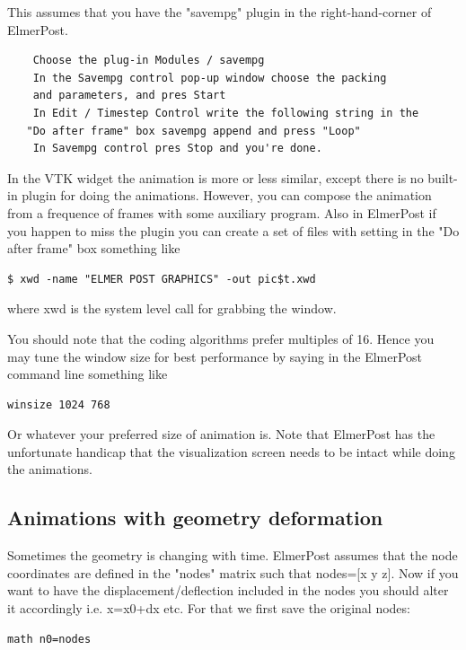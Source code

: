 This assumes that you have the "savempg" plugin in the right-hand-corner of ElmerPost.

\begin{verbatim}
    Choose the plug-in Modules / savempg
    In the Savempg control pop-up window choose the packing
    and parameters, and pres Start
    In Edit / Timestep Control write the following string in the
   "Do after frame" box savempg append and press "Loop"
    In Savempg control pres Stop and you're done. 
\end{verbatim}

In the VTK widget the animation is more or less similar, except there is no built-in plugin for doing the animations. However, you can compose the animation from a frequence of frames with some auxiliary program. Also in ElmerPost if you happen to miss the plugin you can create a set of files with setting in the "Do after frame" box something like

\begin{verbatim}
$ xwd -name "ELMER POST GRAPHICS" -out pic$t.xwd
\end{verbatim}

where xwd is the system level call for grabbing the window.

You should note that the coding algorithms prefer multiples of 16. Hence you may tune the window size for best performance by saying in the ElmerPost command line something like

\begin{verbatim}
winsize 1024 768
\end{verbatim}

Or whatever your preferred size of animation is. Note that ElmerPost has the unfortunate handicap that the visualization screen needs to be intact while doing the animations.

\subsection{Animations with geometry deformation}

Sometimes the geometry is changing with time. ElmerPost assumes that the node coordinates are defined in the "nodes" matrix such that nodes=[x y z]. Now if you want to have the displacement/deflection included in the nodes you should alter it accordingly i.e. x=x0+dx etc. For that we first save the original nodes:

\begin{verbatim}
math n0=nodes
\end{verbatim}

